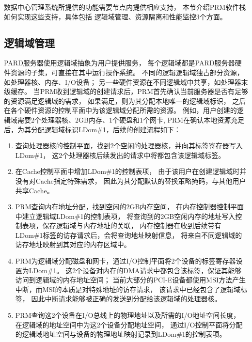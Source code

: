 数据中心管理系统所提供的功能需要节点内提供相应支持，
本节介绍PRM软件栈如何实现这些支持，具体包括
逻辑域管理、资源隔离和性能监控3个方面。

\subsection{逻辑域管理}

PARD服务器使用逻辑域抽象为用户提供服务，
每个逻辑域都是PARD服务器硬件资源的子集，可直接在其中运行操作系统。
不同的逻辑逻辑域独占部分资源，如处理器核、内存、I/O设备；
另一些硬件资源在不同逻辑域中共享，如处理器末级缓存。
当PRM收到逻辑域的创建请求后，PRM首先确认当前服务器是否有足够的资源满足逻辑域的需求，
如果满足，则为其分配本地唯一的逻辑域标识，
之后在各个硬件资源的控制平面中为该逻辑域分配所需的资源。
例如，用户创建的逻辑域需要2个处理器核、2GB内存、1个硬盘和1个网卡,
PRM在确认本地资源充足后，为其分配逻辑域标识LDom\#1，后续的创建流程如下：

\begin{enumerate}[leftmargin=2\parindent, nolistsep, label=\arabic*）]
  \item 查询处理器核的控制平面，找到2个空闲的处理器核，并向其标签寄存器写入LDom\#1，
        这2个处理器核后续发出的请求中将都包含该逻辑域标签。
  \item 在Cache控制平面中增加LDom\#1的控制表项，
        由于该用户在创建逻辑域时并没有对Cache指定特殊需求，
        因此为其分配默认的替换策略掩码，与其他用户共享Cache。
  \item PRM查询内存地址分配，找到空闲的2GB内存空间，
        在内存控制器控制平面中建立逻辑域LDom\#1的控制表项，
        将查询到的2GB空闲内存的地址写入控制表项，保存逻辑域与内存地址的关联，
        内存控制器在收到后续带有LDom\#1标签的访存请求后，会将查询地址映射信息，
        将来自不同逻辑域的访存地址映射到其对应的内存区域中。
  \item PRM为逻辑域分配磁盘和网卡，通过I/O控制平面将2个设备的标签寄存器设置为LDom\#1。
        这2个设备对内存的DMA请求中都包含该标签，保证其能够访问到逻辑域的内存地址空间；
        当前大部分的PCI-E设备都使用MSI方法产生中断，而MSI的本质是对特殊地址的访存请求，
        该请求中已经包含了逻辑域标签，
        因此中断请求能够被正确的发送到分配给该逻辑域的处理器核。
  \item PRM查询这2个设备在I/O总线上的物理地址以及所需的I/O地址空间长度，
        在逻辑域的地址空间中为这2个设备分配地址空间，
        通过I/O控制平面将分配的逻辑域地址空间与设备的物理地址映射记录到LDom\#1的控制表项。
\end{enumerate}

